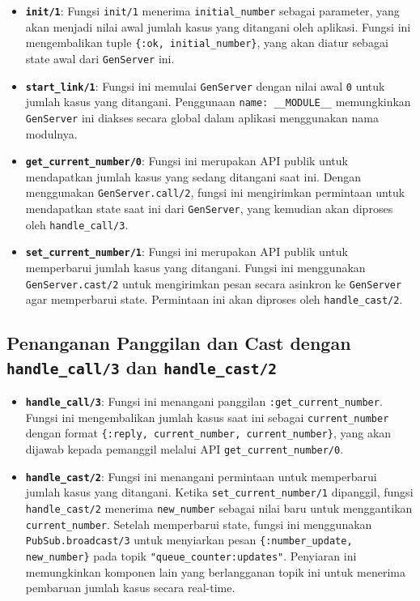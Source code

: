 \begin{itemize}
	\item \textbf{\texttt{init/1}}: Fungsi \texttt{init/1} menerima \texttt{initial\_number} sebagai parameter, yang akan menjadi nilai awal jumlah kasus yang ditangani oleh aplikasi. Fungsi ini mengembalikan tuple \texttt{\{:ok, initial\_number\}}, yang akan diatur sebagai state awal dari \texttt{GenServer} ini.
	
	\item \textbf{\texttt{start\_link/1}}: Fungsi ini memulai \texttt{GenServer} dengan nilai awal \texttt{0} untuk jumlah kasus yang ditangani. Penggunaan \texttt{name: \_\_MODULE\_\_} memungkinkan \texttt{GenServer} ini diakses secara global dalam aplikasi menggunakan nama modulnya.
	
	\item \textbf{\texttt{get\_current\_number/0}}: Fungsi ini merupakan API publik untuk mendapatkan jumlah kasus yang sedang ditangani saat ini. Dengan menggunakan \texttt{GenServer.call/2}, fungsi ini mengirimkan permintaan untuk mendapatkan state saat ini dari \texttt{GenServer}, yang kemudian akan diproses oleh \texttt{handle\_call/3}.
	
	\item \textbf{\texttt{set\_current\_number/1}}: Fungsi ini merupakan API publik untuk memperbarui jumlah kasus yang ditangani. Fungsi ini menggunakan \texttt{GenServer.cast/2} untuk mengirimkan pesan secara asinkron ke \texttt{GenServer} agar memperbarui state. Permintaan ini akan diproses oleh \texttt{handle\_cast/2}.
\end{itemize}

\subsection{Penanganan Panggilan dan Cast dengan \texttt{handle\_call/3} dan \texttt{handle\_cast/2}}

\begin{itemize}
	\item \textbf{\texttt{handle\_call/3}}: Fungsi ini menangani panggilan \texttt{:get\_current\_number}. Fungsi ini mengembalikan jumlah kasus saat ini sebagai \texttt{current\_number} dengan format \texttt{\{:reply, current\_number, current\_number\}}, yang akan dijawab kepada pemanggil melalui API \texttt{get\_current\_number/0}.
	
	\item \textbf{\texttt{handle\_cast/2}}: Fungsi ini menangani permintaan untuk memperbarui jumlah kasus yang ditangani. Ketika \texttt{set\_current\_number/1} dipanggil, fungsi \texttt{handle\_cast/2} menerima \texttt{new\_number} sebagai nilai baru untuk menggantikan \texttt{current\_number}. Setelah memperbarui state, fungsi ini menggunakan \texttt{PubSub.broadcast/3} untuk menyiarkan pesan \texttt{\{:number\_update, new\_number\}} pada topik \texttt{"queue\_counter:updates"}. Penyiaran ini memungkinkan komponen lain yang berlangganan topik ini untuk menerima pembaruan jumlah kasus secara real-time.
\end{itemize}


